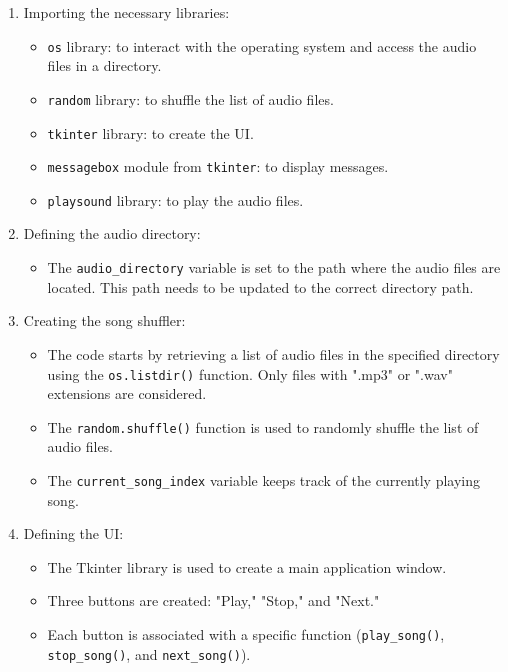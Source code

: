 \documentclass{article}
\begin{document}
\begin{enumerate}
  \item Importing the necessary libraries:
    \begin{itemize}
      \item \texttt{os} library: to interact with the operating system and access the audio files in a directory.
      \item \texttt{random} library: to shuffle the list of audio files.
      \item \texttt{tkinter} library: to create the UI.
      \item \texttt{messagebox} module from \texttt{tkinter}: to display messages.
      \item \texttt{playsound} library: to play the audio files.
    \end{itemize}
  
  \item Defining the audio directory:
    \begin{itemize}
      \item The \texttt{audio\_directory} variable is set to the path where the audio files are located. This path needs to be updated to the correct directory path.
    \end{itemize}
  
  \item Creating the song shuffler:
    \begin{itemize}
      \item The code starts by retrieving a list of audio files in the specified directory using the \texttt{os.listdir()} function. Only files with ".mp3" or ".wav" extensions are considered.
      \item The \texttt{random.shuffle()} function is used to randomly shuffle the list of audio files.
      \item The \texttt{current\_song\_index} variable keeps track of the currently playing song.
    \end{itemize}
  
  \item Defining the UI:
    \begin{itemize}
      \item The Tkinter library is used to create a main application window.
      \item Three buttons are created: "Play," "Stop," and "Next."
      \item Each button is associated with a specific function (\texttt{play\_song()}, \texttt{stop\_song()}, and \texttt{next\_song()}).
    \end{itemize}
  

\end{enumerate}
\end{document}
